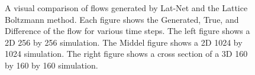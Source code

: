 \documentclass{article}
\begin{document}
\begin{figure}[!t]
\caption{A visual comparison of flows generated by Lat-Net and the Lattice Boltzmann method. Each figure shows the Generated, True, and Difference of the flow for various time steps. The left figure shows a 2D 256 by 256 simulation. The Middel figure shows a 2D 1024 by 1024 simulation. The right figure shows a cross section of a 3D 160 by 160 by 160 simulation.}
\label{2d_image_plot}
\end{figure}
\end{document}
